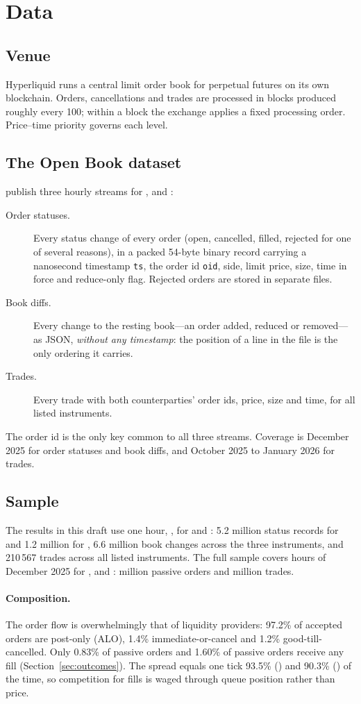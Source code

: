 \section{Data}
\label{sec:data}

\subsection{Venue}
Hyperliquid runs a central limit order book for perpetual futures on its own
blockchain. Orders, cancellations and trades are processed in blocks produced
roughly every 100\ms; within a block the exchange applies a fixed processing
order. Price--time priority governs each level.

\subsection{The Open Book dataset}
\citet{albers2026openbook} publish three hourly streams for \BTC, \ETH{} and \SOL:
\begin{description}
  \item[Order statuses.] Every status change of every order (open, cancelled,
  filled, rejected for one of several reasons), in a packed 54-byte binary
  record carrying a nanosecond timestamp \texttt{ts}, the order id
  \texttt{oid}, side, limit price, size, time in force and reduce-only flag.
  Rejected orders are stored in separate files.
  \item[Book diffs.] Every change to the resting book---an order added, reduced
  or removed---as JSON, \emph{without any timestamp}: the position of a line in
  the file is the only ordering it carries.
  \item[Trades.] Every trade with both counterparties' order ids, price, size
  and time, for all listed instruments.
\end{description}
The order id is the only key common to all three streams. Coverage is December
2025 for order statuses and book diffs, and October 2025 to January 2026 for
trades.

\subsection{Sample}
The results in this draft use one hour, \pilothour, for \BTC{} and \SOL{}:
5.2 million status records for \BTC{} and 1.2 million for \SOL, 6.6 million book
changes across the three instruments, and 210\,567 trades across all listed
instruments. The full sample covers \tbd{} hours of December 2025 for \BTC,
\ETH{} and \SOL{}: \tbd{} million passive orders and \tbd{} million trades.

\paragraph{Composition.}
The order flow is overwhelmingly that of liquidity providers: 97.2\% of
accepted \SOL{} orders are post-only (ALO), 1.4\% immediate-or-cancel and
1.2\% good-till-cancelled. Only 0.83\% of passive \SOL{} orders and 1.60\% of
passive \BTC{} orders receive any fill (Section~\ref{sec:outcomes}). The spread
equals one tick 93.5\% (\SOL) and 90.3\% (\BTC) of the time, so competition for
fills is waged through queue position rather than price.
